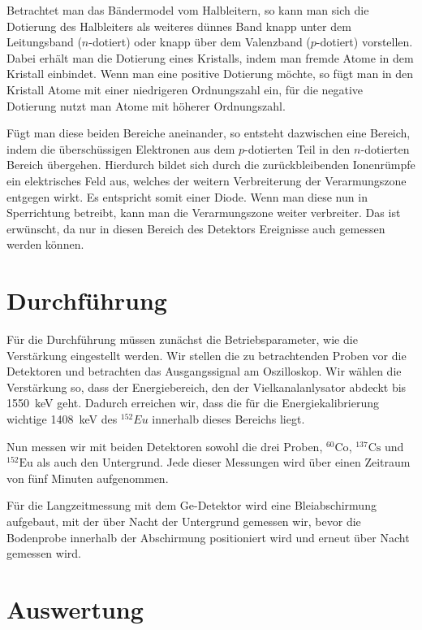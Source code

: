 \documentclass[11pt, ngerman, fleqn, DIV=15, headinclude, BCOR=2cm]{scrreprt}
\begin{document}
Betrachtet man das Bändermodel vom Halbleitern, so kann man sich die Dotierung
des Halbleiters als weiteres dünnes Band knapp unter dem Leitungsband
($n$-dotiert) oder knapp über dem Valenzband ($p$-dotiert) vorstellen.
Dabei erhält man die Dotierung eines Kristalls, indem man fremde Atome in dem
Kristall einbindet.
Wenn man eine positive Dotierung möchte, so fügt man in den Kristall Atome mit einer
niedrigeren Ordnungszahl ein, für die negative Dotierung nutzt man  Atome mit
höherer Ordnungszahl.

Fügt man diese beiden Bereiche aneinander, so entsteht dazwischen eine Bereich,
indem die überschüssigen Elektronen aus dem $p$-dotierten Teil in den
$n$-dotierten Bereich übergehen. 
Hierdurch bildet sich durch die zurückbleibenden Ionenrümpfe ein elektrisches Feld aus, welches
der weitern Verbreiterung der Verarmungszone entgegen wirkt.
Es entspricht somit einer Diode.
Wenn man diese nun in Sperrichtung betreibt, kann man die Verarmungszone weiter
verbreiter.
Das ist erwünscht, da nur in diesen Bereich des Detektors Ereignisse auch
gemessen werden können.

\chapter{Durchführung}

Für die Durchführung müssen zunächst die Betriebsparameter, wie die
Verstärkung eingestellt werden. Wir stellen die zu betrachtenden Proben vor die
Detektoren und betrachten das Ausgangssignal am Oszilloskop. Wir wählen die
Verstärkung so, dass der Energiebereich, den der Vielkanalanlysator abdeckt bis
\SI{1550}{\kilo\electronvolt} geht. Dadurch erreichen wir, dass die für die
Energiekalibrierung wichtige \SI{1408}{\kilo\electronvolt} des $^{152}Eu$
innerhalb dieses Bereichs liegt.

Nun messen wir mit beiden Detektoren sowohl die drei Proben, $^{60}\text{Co}$,
$^{137}\text{Cs}$ und $^{152}\text{Eu}$ als auch den Untergrund. Jede dieser
Messungen wird über einen Zeitraum von fünf Minuten aufgenommen.

Für die Langzeitmessung mit dem Ge-Detektor wird eine Bleiabschirmung
aufgebaut, mit der über Nacht der Untergrund gemessen wir, bevor die Bodenprobe
innerhalb der Abschirmung positioniert wird und erneut über Nacht gemessen wird.

\chapter{Auswertung}
\end{document}
